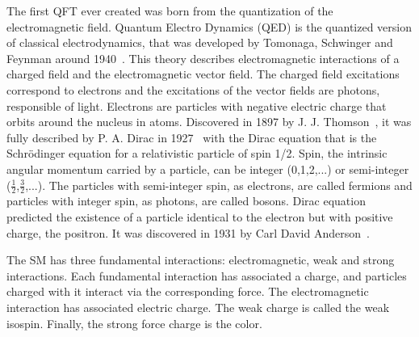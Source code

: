 The first QFT ever created was born from the quantization of the electromagnetic field. Quantum Electro Dynamics (QED) is the quantized version of classical electrodynamics, that was developed by Tomonaga, Schwinger and Feynman around 1940~\cite{Griffiths:2008zz}. This theory describes electromagnetic interactions of a charged field and the electromagnetic vector field. The charged field excitations correspond to electrons and the excitations of the vector fields are photons, responsible of light. Electrons are particles with negative electric charge that orbits around the nucleus in atoms. Discovered in 1897 by J. J. Thomson~\cite{Griffiths:2008zz}, it was fully described by P. A. Dirac in 1927~\cite{Griffiths:2008zz} with the Dirac equation that is the Schr\"{o}dinger equation for a relativistic particle of spin 1/2. Spin, the intrinsic angular momentum carried by a particle, can be integer (0,1,2,...) or semi-integer ($\frac{1}{2}$,$\frac{3}{2}$,...). The particles with semi-integer spin, as electrons, are called fermions and particles with integer spin, as photons, are called bosons. Dirac equation predicted the existence of a particle identical to the electron but with positive charge, the positron. It was discovered in 1931 by Carl David Anderson~\cite{Griffiths:2008zz}.

The SM has three fundamental interactions: electromagnetic, weak and strong interactions. Each fundamental interaction has associated a charge, and particles charged with it interact via the corresponding force. The electromagnetic interaction has associated electric charge. The weak charge is called the weak isospin. Finally, the strong force charge is the color.

